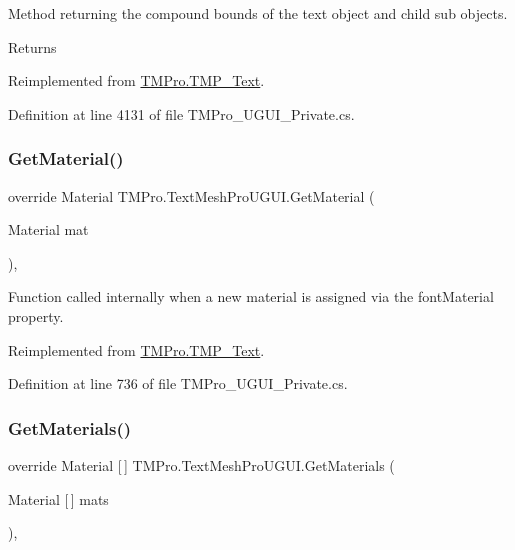 Method returning the compound bounds of the text object and child sub objects. 

\begin{DoxyReturn}{Returns}

\end{DoxyReturn}


Reimplemented from \mbox{\hyperlink{class_t_m_pro_1_1_t_m_p___text_a0628c368c630a855a7001344fca270ba}{T\+M\+Pro.\+T\+M\+P\+\_\+\+Text}}.



Definition at line 4131 of file T\+M\+Pro\+\_\+\+U\+G\+U\+I\+\_\+\+Private.\+cs.

\mbox{\label{class_t_m_pro_1_1_text_mesh_pro_u_g_u_i_a51ff5f00ca136e0cb8c8865bb6e6ede9}} 
\subsubsection{\texorpdfstring{GetMaterial()}{GetMaterial()}}
{\footnotesize\ttfamily override Material T\+M\+Pro.\+Text\+Mesh\+Pro\+U\+G\+U\+I.\+Get\+Material (\begin{DoxyParamCaption}\item[{Material}]{mat }\end{DoxyParamCaption})\hspace{0.3cm}{\ttfamily [protected]}, {\ttfamily [virtual]}}



Function called internally when a new material is assigned via the font\+Material property. 



Reimplemented from \mbox{\hyperlink{class_t_m_pro_1_1_t_m_p___text_a0a573365fce6e2d9e49b0f7d6679834b}{T\+M\+Pro.\+T\+M\+P\+\_\+\+Text}}.



Definition at line 736 of file T\+M\+Pro\+\_\+\+U\+G\+U\+I\+\_\+\+Private.\+cs.

\mbox{\label{class_t_m_pro_1_1_text_mesh_pro_u_g_u_i_a4502a341b8623af0a250ce549762fc28}} 
\subsubsection{\texorpdfstring{GetMaterials()}{GetMaterials()}}
{\footnotesize\ttfamily override Material \mbox{[}$\,$\mbox{]} T\+M\+Pro.\+Text\+Mesh\+Pro\+U\+G\+U\+I.\+Get\+Materials (\begin{DoxyParamCaption}\item[{Material \mbox{[}$\,$\mbox{]}}]{mats }\end{DoxyParamCaption})\hspace{0.3cm}{\ttfamily [protected]}, {\ttfamily [virtual]}}



